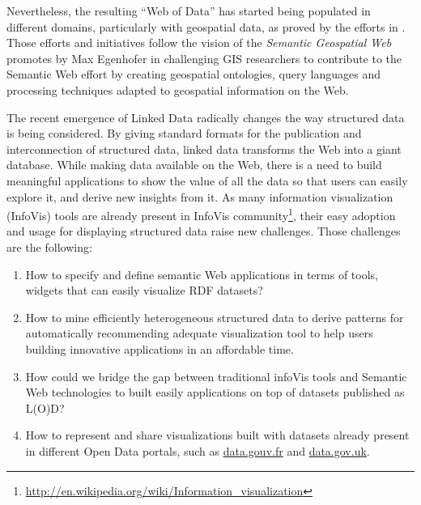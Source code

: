 Nevertheless, the resulting ``Web of Data'' has started being populated in different domains, particularly with geospatial data, as proved by the efforts in \cite{goodwin08,linkedgeodata,deLeon2010,Salas2011}. Those efforts and initiatives follow the vision of the \textit{Semantic Geospatial Web} promotes by Max Egenhofer in \cite{egenhofer12} challenging GIS researchers to contribute to the Semantic Web effort by creating geospatial ontologies, query languages and processing techniques adapted to geospatial information on the Web. 


The recent emergence of Linked Data radically changes the way structured data is being considered. By giving standard formats for the publication and interconnection of structured data, linked data transforms the Web into a giant database. While making data available on the Web, there is a need to build meaningful applications to show the value of all the data so that users can easily explore it, and derive new insights from it. As many information visualization (InfoVis) tools are already present in InfoVis community\footnote{\url{http://en.wikipedia.org/wiki/Information_visualization}}, their easy adoption and usage for displaying structured data raise new challenges. Those challenges are the following:
\begin{enumerate}
\item How to specify and define semantic Web applications in terms of tools, widgets that can easily visualize RDF datasets?
\item How to mine efficiently heterogeneous structured data to derive patterns for automatically recommending adequate visualization tool to help users building innovative applications in an affordable time.
\item How could we bridge the gap between traditional infoVis tools and Semantic Web technologies to built easily applications on top of datasets published as L(O)D?
\item How to represent and share visualizations built with datasets already present in different Open Data portals, such as \url{data.gouv.fr} and \url{data.gov.uk}.  
\end{enumerate}

  

